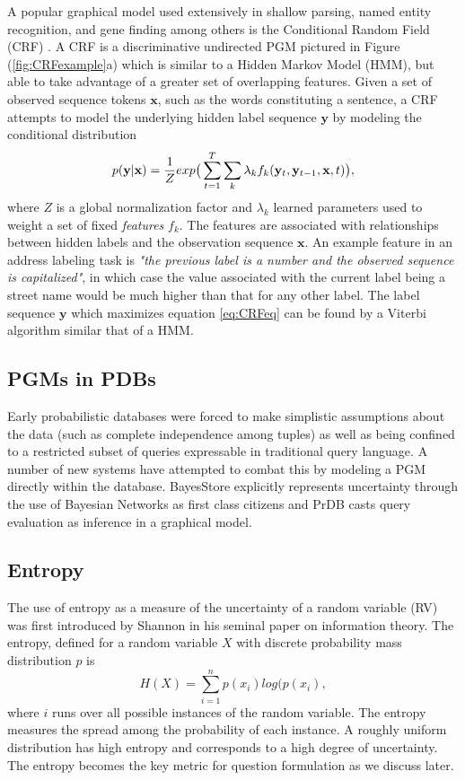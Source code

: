 A popular graphical model used extensively in shallow parsing, named entity recognition, and gene finding among others is the Conditional Random Field (CRF) \cite{Lafferty01}.  A CRF is a discriminative undirected PGM pictured in Figure (\ref{fig:CRFexample}a) which is similar to a Hidden Markov Model (HMM), but able to take advantage of a greater set of overlapping features.  Given a set of observed sequence tokens $\mathbf{x}$, such as the words constituting a sentence, a CRF attempts to model the underlying hidden label sequence $\mathbf{y}$ by modeling the conditional distribution
\begin{equation}
\label{eq:CRFeq}
p(\mathbf{y}|\mathbf{x}) = \frac{1}{Z}exp \big{(} \sum_{t=1}^{T}\sum_{k}\lambda_{k}f_{k}(\mathbf{y}_{t},\mathbf{y}_{t-1},\mathbf{x},t)\big{)},
\end{equation}
where $Z$ is a global normalization factor and $\lambda_{k}$ learned parameters used to weight a set of fixed \textit{features} $f_{k}$. The features are associated with relationships between hidden labels and the observation sequence $\mathbf{x}$.  An example feature in an address labeling task is \textit{"the previous label is a number and the observed sequence is capitalized"}, in which case the value associated with the current label being a street name would be much higher than that for any other label.  The label sequence $\mathbf{y}$ which maximizes equation \ref{eq:CRFeq} can be found by a Viterbi algorithm similar that of a HMM.

\subsection{PGMs in PDBs}
Early probabilistic databases were forced to make simplistic assumptions about the data (such as complete independence among tuples) as well as being confined to a restricted subset of queries expressable in traditional query language.  A number of new systems have attempted to combat this by modeling a PGM directly within the database.  BayesStore \cite{Wang08} explicitly represents uncertainty through the use of Bayesian Networks as first class citizens and PrDB \cite{Sen09} casts query evaluation as inference in a graphical model.

\subsection{Entropy}
The use of entropy as a measure of the uncertainty of a random variable (RV) was first introduced by Shannon \cite{Shannon48} in his seminal paper on information theory.  The entropy, defined for a random variable $X$ with discrete probability mass distribution $p$ is 
\begin{equation}
H(X) = \sum_{i=1}^{n}p(x_{i})log(p(x_{i}),
\end{equation}
where $i$ runs over all possible instances of the random variable.  The entropy measures the spread among the probability of each instance.  A roughly uniform distribution has high entropy and corresponds to a high degree of uncertainty.  The entropy becomes the key metric for question formulation as we discuss later.


